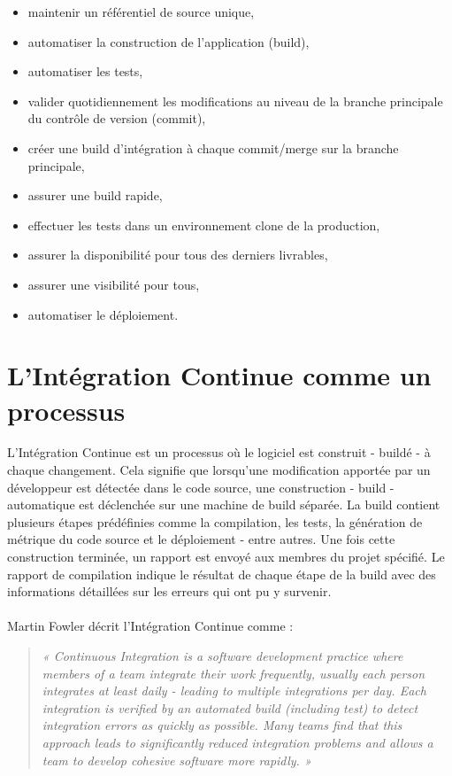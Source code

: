   \begin{itemize}
    \item maintenir un référentiel de source unique,
    \item automatiser la construction de l’application (\gls{build}),
    \item automatiser les tests,
    \item valider quotidiennement les modifications au niveau de la branche principale du contrôle de version (\gls{commit}),
    \item créer une build d’intégration à chaque commit/merge sur la branche principale,
    \item assurer une build rapide,
    \item effectuer les tests dans un environnement clone de la production,
    \item assurer la disponibilité pour tous des derniers livrables,
    \item assurer une visibilité pour tous,
    \item automatiser le déploiement.\\
  \end{itemize}

  \section{L'Intégration Continue comme un processus}
  L’Intégration Continue est un processus où le logiciel est construit - buildé - à chaque changement. Cela signifie que lorsqu’une modification apportée par un développeur est détectée dans le code source, une construction - build - automatique est déclenchée sur une machine de build séparée. La build contient plusieurs étapes prédéfinies comme la compilation, les tests, la génération de métrique du code source et le déploiement - entre autres. Une fois cette construction terminée, un rapport est envoyé aux membres du projet spécifié. Le rapport de compilation indique le résultat de chaque étape de la build avec des informations détaillées sur les erreurs qui ont pu y survenir.\\\\

  Martin Fowler \cite{Fow00} décrit l’Intégration Continue comme :\\
  \begin{quotation}
    \emph{« Continuous Integration is a software development practice where members of a team integrate their work frequently, usually each person integrates at least daily - leading to multiple integrations per day. Each integration is verified by an automated build (including test) to detect integration errors as quickly as possible. Many teams find that this approach leads to significantly reduced integration problems and allows a team to develop cohesive software more rapidly. »}
  \end{quotation}

